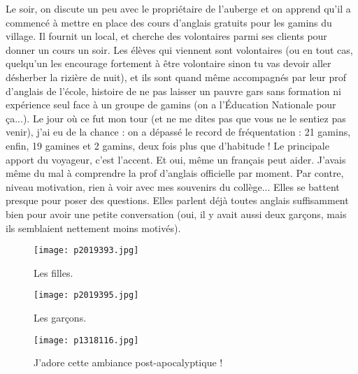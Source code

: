 \documentclass{book}
\begin{document}
Le soir, on discute un peu avec le propriétaire de l'auberge et on apprend qu'il a commencé à mettre en place des cours d'anglais gratuits pour les gamins du village. Il fournit un local, et cherche des volontaires parmi ses clients pour donner un cours un soir. Les élèves qui viennent sont volontaires (ou en tout cas, quelqu'un les encourage fortement à être volontaire sinon tu vas devoir aller désherber la rizière de nuit), et ils sont quand même accompagnés par leur prof d'anglais de l'école, histoire de ne pas laisser un pauvre gars sans formation ni expérience seul face à un groupe de gamins (on a l’Éducation Nationale pour ça...). Le jour où ce fut mon tour (et ne me dites pas que vous ne le sentiez pas venir), j'ai eu de la chance : on a dépassé le record de fréquentation : 21 gamins, enfin, 19 gamines et 2 gamins, deux fois plus que d'habitude ! Le principale apport du voyageur, c'est l'accent. Et oui, même un français peut aider. J'avais même du mal à comprendre la prof d'anglais officielle par moment. Par contre, niveau motivation, rien à voir avec mes souvenirs du collège... Elles se battent presque pour poser des questions. Elles parlent déjà toutes anglais suffisamment bien pour avoir une petite conversation (oui, il y avait aussi deux garçons, mais ils semblaient nettement moins motivés).


\begin{figure}[h]
\centering
\texttt{[image: p2019393.jpg]}
\caption*{Les filles.}
\end{figure}


\begin{figure}[h]
\centering
\texttt{[image: p2019395.jpg]}
\caption*{Les garçons.}
\end{figure}


\begin{figure}[h]
\centering
\texttt{[image: p1318116.jpg]}
\caption*{J'adore cette ambiance post-apocalyptique !}
\end{figure}
\end{document}
